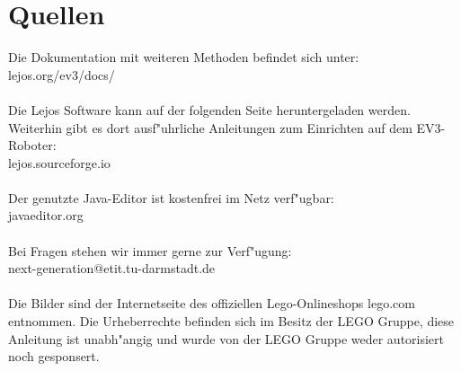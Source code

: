 \section{Quellen}
	Die Dokumentation mit weiteren Methoden befindet sich unter:\\
	lejos.org/ev3/docs/\\ \\
	
	Die Lejos Software kann auf der folgenden Seite heruntergeladen werden. Weiterhin gibt es dort ausf"uhrliche Anleitungen zum Einrichten auf dem EV3-Roboter:\\
	lejos.sourceforge.io\\ \\
	
	Der genutzte Java-Editor ist kostenfrei im Netz verf"ugbar:\\
	javaeditor.org\\ \\
	
	Bei Fragen stehen wir immer gerne zur Verf"ugung:\\
	next-generation@etit.tu-darmstadt.de \\ \\
	
	Die Bilder sind der Internetseite des offiziellen Lego-Onlineshops lego.com entnommen. Die Urheberrechte befinden sich im Besitz der LEGO Gruppe, diese Anleitung ist unabh"angig und wurde von der LEGO Gruppe weder autorisiert noch gesponsert.